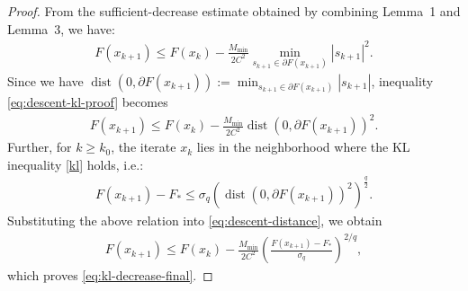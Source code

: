 \documentclass[10pt,a4paper]{amsart}
\begin{document}
\begin{proof}
From the sufficient-decrease estimate obtained by combining
Lemma~1 and Lemma~3, we have:
\begin{align}
\label{eq:descent-kl-proof}
F(x_{k+1})
\leq
F(x_k)-
\frac{M_{\min}}{2C^2}
\min_{s_{k+1}\in\partial F(x_{k+1})}
|s_{k+1}|^2.
\end{align}
Since we have
$\operatorname{dist}(0,\partial F(x_{k+1}))
:=
\min_{s_{k+1}\in\partial F(x_{k+1})}
|s_{k+1}|$,
inequality \eqref{eq:descent-kl-proof} becomes
\begin{align}
F(x_{k+1})
\leq
F(x_k)
-
\frac{M_{\min}}{2C^2}
\operatorname{dist}(0,\partial F(x_{k+1}))^2.
\label{eq:descent-distance}
\end{align}
Further, for $k\geq k_0$, the iterate $x_{k}$ lies in the neighborhood
where the KL inequality \eqref{kl} holds, i.e.: 
\begin{align*}
F(x_{k+1})-F_*
\leq
\sigma_q
\left(\operatorname{dist}(0,\partial F(x_{k+1}))^2\right)^{\frac{q}{2}}.
\end{align*}
Substituting the above relation into \eqref{eq:descent-distance}, we obtain
\begin{align*}
F(x_{k+1})
\leq
F(x_k)
-
\frac{M_{\min}}{2C^2}
\left(
\frac{F(x_{k+1})-F_*}{\sigma_q}
\right)^{2/q},
\end{align*}
which proves \eqref{eq:kl-decrease-final}.
\end{proof}
\end{document}
